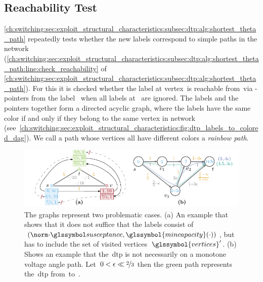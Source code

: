 \subsection{Reachability Test}
\label{ch:switching:sec:exploit_structural_characteristics:subsec:reachibility_test}
% 
\cref{ch:switching:sec:exploit_structural_characteristics:subsec:dtp:alg:shortest_theta_path}
repeatedly tests whether the new labels correspond to simple paths in the
network
(\cref{ch:switching:sec:exploit_structural_characteristics:subsec:dtp:alg:shortest_theta_path:line:check_reachability}
of
\cref{ch:switching:sec:exploit_structural_characteristics:subsec:dtp:alg:shortest_theta_path}).
For this it is checked whether the label at vertex~\source is reachable
from~\vertexa via
\parent-pointers from the label~ when all labels at~\vertexb
are ignored. The labels and the pointers together form a directed acyclic graph,
where the labels have the same color if and only if they belong to the same
vertex in network~
(see~\cref{ch:switching:sec:exploit_structural_characteristics:fig:dtp_labels_to_colored_dag}).
We call a path whose vertices all have different colors a \emph{rainbow path}.
%
\begin{figure}[t!]
  \centering
  \includegraphics{switchplacement/figures/labels_and_does_not_lie_on_monoton_theta_paths.pdf}
  \caption[\gls{dtp} problematic cases.]{%
  The graphs represent two problematic cases. (a) An example that shows that it
  does not suffice that the labels consist
  of~$(\bnorm{\cdot},\glssymbol{mincapacity}(\cdot))$, but has to include the
  set of visited vertices~$\glssymbol{vertices}'$. (b) Shows an example that
  the~\gls{dtp} is not necessarily on a monotone voltage angle path. Let~$0 <
  \epsilon \ll \nicefrac{2}{3}$ then the green path represents the~\gls{dtp}
  from~\source to~\sink. }%
  \label{ch:switching:sec:exploit_structural_characteristics:fig:labels_and_does_not_lie_on_monoton_theta_paths}
\end{figure}
